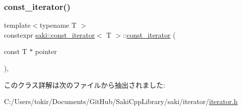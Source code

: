 \subsubsection{\texorpdfstring{const\+\_\+iterator()}{const\_iterator()}}
{\footnotesize\ttfamily template$<$typename T $>$ \\
constexpr \mbox{\hyperlink{classsaki_1_1const__iterator}{saki\+::const\+\_\+iterator}}$<$ T $>$\+::\mbox{\hyperlink{classsaki_1_1const__iterator}{const\+\_\+iterator}} (\begin{DoxyParamCaption}\item[{const T $\ast$}]{pointer }\end{DoxyParamCaption})\hspace{0.3cm}{\ttfamily [inline]}, {\ttfamily [explicit]}}



このクラス詳解は次のファイルから抽出されました\+:\begin{DoxyCompactItemize}
\item 
C\+:/\+Users/tokir/\+Documents/\+Git\+Hub/\+Saki\+Cpp\+Library/saki/iterator/\mbox{\hyperlink{iterator_2iterator_8h}{iterator.\+h}}\end{DoxyCompactItemize}

